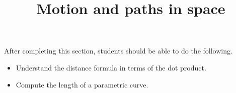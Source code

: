 \documentclass{ximera}
\title{Motion and paths in space}
\begin{document}
\begin{abstract}
\end{abstract}

\maketitle

\begin{sectionOutcomes}

After completing this section, students should be able to do the following.

\begin{itemize}
\item Understand the distance formula in terms of the dot product.
\item Compute the length of a parametric curve.
\end{itemize}

\end{sectionOutcomes}
\end{document}

